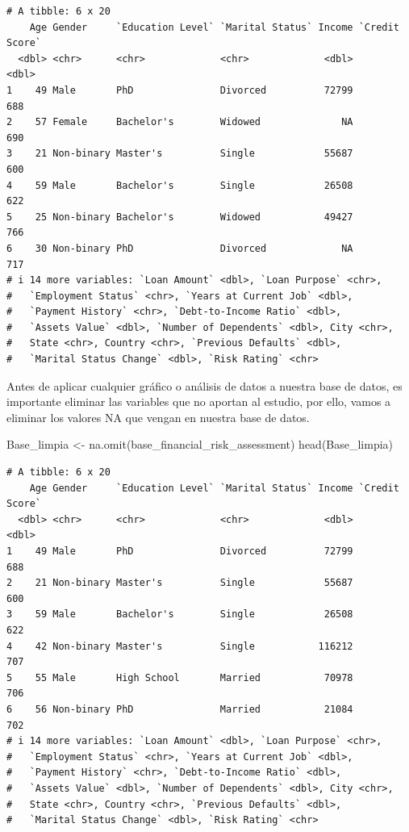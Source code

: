 \documentclass[
  letterpaper,
  DIV=11,
  numbers=noendperiod]{scrreprt}
\newenvironment{Shaded}{\begin{snugshade}}{\end{snugshade}}
\newcommand{\FunctionTok}[1]{\textcolor[rgb]{0.28,0.35,0.67}{#1}}
\newcommand{\NormalTok}[1]{\textcolor[rgb]{0.00,0.23,0.31}{#1}}
\newcommand{\OtherTok}[1]{\textcolor[rgb]{0.00,0.23,0.31}{#1}}
\begin{document}
\begin{verbatim}
# A tibble: 6 x 20
    Age Gender     `Education Level` `Marital Status` Income `Credit Score`
  <dbl> <chr>      <chr>             <chr>             <dbl>          <dbl>
1    49 Male       PhD               Divorced          72799            688
2    57 Female     Bachelor's        Widowed              NA            690
3    21 Non-binary Master's          Single            55687            600
4    59 Male       Bachelor's        Single            26508            622
5    25 Non-binary Bachelor's        Widowed           49427            766
6    30 Non-binary PhD               Divorced             NA            717
# i 14 more variables: `Loan Amount` <dbl>, `Loan Purpose` <chr>,
#   `Employment Status` <chr>, `Years at Current Job` <dbl>,
#   `Payment History` <chr>, `Debt-to-Income Ratio` <dbl>,
#   `Assets Value` <dbl>, `Number of Dependents` <dbl>, City <chr>,
#   State <chr>, Country <chr>, `Previous Defaults` <dbl>,
#   `Marital Status Change` <dbl>, `Risk Rating` <chr>
\end{verbatim}

Antes de aplicar cualquier gráfico o análisis de datos a nuestra base de
datos, es importante eliminar las variables que no aportan al estudio,
por ello, vamos a eliminar los valores NA que vengan en nuestra base de
datos.

\begin{Shaded}
\begin{Highlighting}[]
\NormalTok{Base\_limpia }\OtherTok{\textless{}{-}} \FunctionTok{na.omit}\NormalTok{(base\_financial\_risk\_assessment)}
\FunctionTok{head}\NormalTok{(Base\_limpia)}
\end{Highlighting}
\end{Shaded}

\begin{verbatim}
# A tibble: 6 x 20
    Age Gender     `Education Level` `Marital Status` Income `Credit Score`
  <dbl> <chr>      <chr>             <chr>             <dbl>          <dbl>
1    49 Male       PhD               Divorced          72799            688
2    21 Non-binary Master's          Single            55687            600
3    59 Male       Bachelor's        Single            26508            622
4    42 Non-binary Master's          Single           116212            707
5    55 Male       High School       Married           70978            706
6    56 Non-binary PhD               Married           21084            702
# i 14 more variables: `Loan Amount` <dbl>, `Loan Purpose` <chr>,
#   `Employment Status` <chr>, `Years at Current Job` <dbl>,
#   `Payment History` <chr>, `Debt-to-Income Ratio` <dbl>,
#   `Assets Value` <dbl>, `Number of Dependents` <dbl>, City <chr>,
#   State <chr>, Country <chr>, `Previous Defaults` <dbl>,
#   `Marital Status Change` <dbl>, `Risk Rating` <chr>
\end{verbatim}
\end{document}
